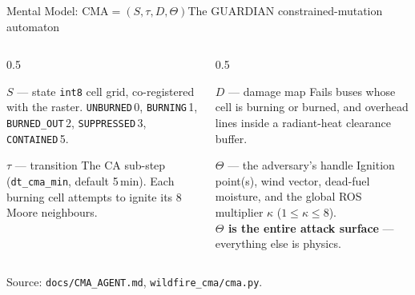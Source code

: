 \documentclass[aspectratio=169,9pt]{beamer}
\newcommand{\code}[1]{{\small\texttt{#1}}}
\newcommand{\srcnote}[1]{\vfill{\scriptsize\color{csladarkgray}#1}}
\begin{document}
\begin{frame}{Mental Model: $\mathrm{CMA} = (S, \tau, D, \Theta)$}{The GUARDIAN constrained-mutation automaton}
  \begin{columns}[T,onlytextwidth]
    \begin{column}{0.5\textwidth}
      \begin{block}{$S$ --- state}
        \small \code{int8} cell grid, co-registered with the raster.
        \code{UNBURNED}\,0, \code{BURNING}\,1, \code{BURNED\_OUT}\,2,
        \code{SUPPRESSED}\,3, \code{CONTAINED}\,5.
      \end{block}
      \begin{block}{$\tau$ --- transition}
        \small The CA sub-step (\code{dt\_cma\_min}, default 5\,min). Each
        burning cell attempts to ignite its 8 Moore neighbours.
      \end{block}
    \end{column}
    \begin{column}{0.5\textwidth}
      \begin{block}{$D$ --- damage map}
        \small Fails buses whose cell is burning or burned, and overhead
        lines inside a radiant-heat clearance buffer.
      \end{block}
      \begin{alertblock}{$\Theta$ --- the adversary's handle}
        \small Ignition point(s), wind vector, dead-fuel moisture, and the
        global ROS multiplier $\kappa$ ($1 \le \kappa \le 8$).\\[3pt]
        \textbf{$\Theta$ is the entire attack surface} --- everything else
        is physics.
      \end{alertblock}
    \end{column}
  \end{columns}
  \srcnote{Source: \texttt{docs/CMA\_AGENT.md}, \texttt{wildfire\_cma/cma.py}.}
\end{frame}
\end{document}
